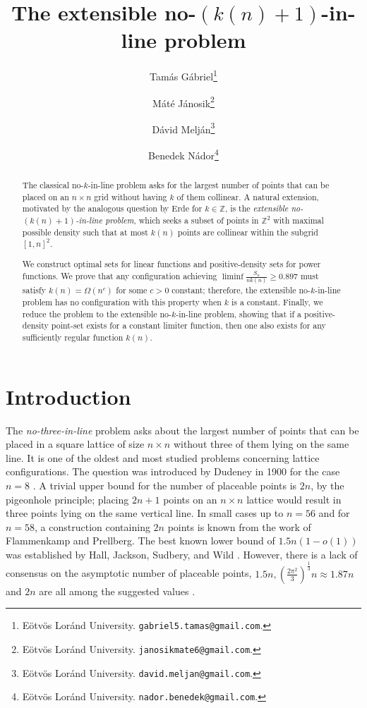 \documentclass[11pt,a4paper]{article}
\date{}
\title{The extensible no-$(k(n)+1)$-in-line problem}
\author{
    Tamás Gábriel\thanks{
    Eötvös Loránd University.
    \texttt{gabriel5.tamas@gmail.com}.}
    \and
    Máté Jánosik\thanks{
    Eötvös Loránd University.
    \texttt{janosikmate6@gmail.com}.}
    \and
    Dávid Melján\thanks{
    Eötvös Loránd University.
    \texttt{david.meljan@gmail.com}.}
    \and
    Benedek Nádor\thanks{
    Eötvös Loránd University.
    \texttt{nador.benedek@gmail.com}.}
}
\numberwithin{equation}{section}
\begin{document}
\maketitle
\begin{abstract}
\noindent
The classical no-$k$-in-line problem asks for the largest number of points that can be placed on an $n \times n$ grid without having $k$ of them collinear. A natural extension, motivated by the analogous question by Erde for $k\in \mathbb{Z}$, is the \emph{extensible no-$(k(n)+1)$-in-line problem}, which seeks a subset of points in $\mathbb{Z}^2$ with maximal possible density such that at most $k(n)$ points are collinear within the subgrid $[1,n]^2$.

\noindent We construct optimal sets for linear functions and positive-density sets for power functions. We prove that any configuration achieving $\liminf\frac{S_n}{n k(n)} \ge 0.897$ must satisfy $k(n) = \Omega( n^c)$ for some $c>0$ constant; therefore, the extensible no-$k$-in-line problem has no configuration with this property when $k$ is a constant. Finally, we reduce the problem to the extensible no-$k$-in-line problem, showing that if a positive-density point-set exists for a constant limiter function, then one also exists for any sufficiently regular function $k(n)$.
\end{abstract}

\section{Introduction}

The \textit{no-three-in-line} problem asks about the largest number of points that can be placed in a square lattice of size  $n\times n$ without three of them lying on the same line. It is one of the oldest and most studied problems concerning lattice configurations. The question was introduced by {Dudeney} in 1900 for the case $n=8$ \cite{dudeney-1900-weekly-dispatch} \cite{dudeney1958amusements}. A trivial upper bound for the number of placeable points is $2n$, by the pigeonhole principle; placing $2n+1$ points on an $n\times n$ lattice would result in three points lying on the same vertical line. In small cases up to $n=56$ and for $n=58$, a construction containing $2n$ points is known from the work of Flammenkamp and Prellberg\cite{oeis-A272651}. The best known lower bound of $1.5n(1-o(1))$ was established by Hall, Jackson, Sudbery, and Wild \cite{hall1975some}. However, there is a lack of consensus on the asymptotic number of placeable points, $1.5n,\left(\frac{2\pi^2}{3}\right)^{\frac13}n\approx1.87n$ and $2n$ are all among the suggested values \cite{green100,Brass2005,Guy/Kelly:1968}.
\end{document}
